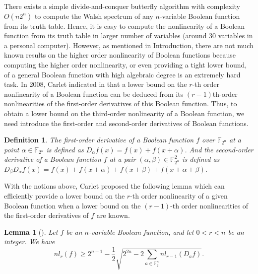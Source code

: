 \documentclass{article}
\newcommand{\F}{\mathbb{F}}
\newcommand{\0}{\textbf{0}}
\newcommand{\1}{\textbf{1}}
\theoremstyle{plain}
\newtheorem{lemma}{Lemma}
\newtheorem{definition}{Definition}
\begin{document}
    There exists a simple divide-and-conquer butterfly algorithm with complexity $O(n2^n)$ to compute the Walsh spectrum of any $n$-variable Boolean function from its truth table.
    Hence, it is easy to compute the nonlinearity of a Boolean function from its truth table in larger number of variables (around $30$ variables in a personal computer).
    However, as mentioned in Introduction, there are not much known results on the higher order nonlinearity of Boolean functions because computing the higher order nonlinearity, or even providing a tight lower bound, of a general Boolean function with high algebraic degree is an extremely hard task.
    In 2008, Carlet indicated in \cite{Carlet2008lowbound_NL_profile} that a lower bound on the $r$-th order nonlinearity of a Boolean function can be deduced from its $(r-1)$th-order nonlinearities of the first-order derivatives of this Boolean function.
    Thus, to obtain a lower bound on the third-order nonlinearity of a Boolean function, we need introduce the first-order and second-order derivatives of Boolean functions.
    \begin{definition}
        The first-order derivative of a Boolean function $f$ over $\F_{2^n}$ at a point $\alpha\in\F_{2^n}$ is defined as $D_{\alpha}f(x)=f(x)+f(x+\alpha)$.
        And the second-order derivative of a Boolean function $f$ at a pair $(\alpha,\beta)\in\F_{2^n}^2$ is defined as $D_{\beta}D_{\alpha}f(x)=f(x)+f(x+\alpha)+f(x+\beta)+f(x+\alpha+\beta)$.
    \end{definition}
    With the notions above, Carlet proposed the following lemma which can efficiently provide a lower bound on the $r$-th order nonlinearity of a given Boolean function when a lower bound on the $(r-1)$-th order nonlinearities of the first-order derivatives of $f$ are known.
    \begin{lemma}[\cite{Carlet2008lowbound_NL_profile}]\label{thm:High_order_nl_bound1}
        Let $f$ be an $n$-variable Boolean function, and let $0<r<n$ be an integer.
        We have
        \[nl_r(f)\ge 2^{n-1}-\frac{1}{2}\sqrt{2^{2n}-2\sum_{a\in\F_2^n}nl_{r-1}(D_af)}.\]
    \end{lemma}
\end{document}
